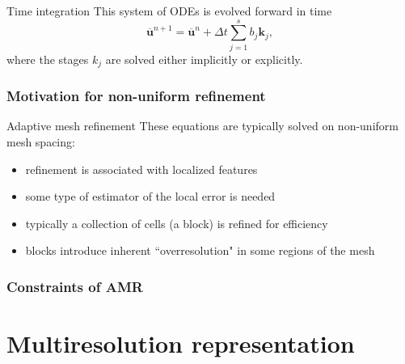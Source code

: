 \documentclass{beamer}
\begin{document}
\begin{frame}{Time integration}
    This system of ODEs is evolved forward in time
    \begin{equation}
        \overline{\bm{u}}^{n+1} = \overline{\bm{u}}^{n} + \Delta t \sum_{j=1}^{s} b_{j}
        \bm{k}_{j},
    \end{equation}
    where the stages $k_{j}$ are solved either implicitly or explicitly.
\end{frame}

\begin{frame}
    \frametitle{Motivation for non-uniform refinement}
\end{frame}

\begin{frame}{Adaptive mesh refinement}
    These equations are typically solved on non-uniform mesh spacing:
    \begin{itemize}
        \item<2-> refinement is associated with localized features
        \item<3-> some type of estimator of the local error is needed
        \item<4-> typically a collection of cells (a block) is refined for efficiency
        \item<5-> blocks introduce inherent ``overresolution" in some regions of the mesh
    \end{itemize}
\end{frame}

\begin{frame}
    \frametitle{Constraints of AMR}
\end{frame}


\section{Multiresolution representation}
\end{document}
